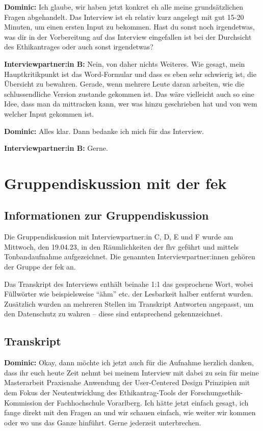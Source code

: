 \documentclass[a4paper,12pt,twoside]{scrreprt}
\begin{document}
\textbf{Dominic:} Ich glaube, wir haben jetzt konkret eh alle meine grundsätzlichen Fragen abgehandelt. Das Interview ist eh relativ kurz angelegt mit gut 15-20 Minuten, um einen ersten Input zu bekommen. Hast du sonst noch irgendetwas, was dir in der Vorbereitung auf das Interview eingefallen ist bei der Durchsicht des Ethikantrages oder auch sonst irgendetwas?

\textbf{Interviewpartner:in B:} Nein, von daher nichts Weiteres. Wie gesagt, mein Hauptkritikpunkt ist das Word-Formular und dass es eben sehr schwierig ist, die Übersicht zu bewahren. Gerade, wenn mehrere Leute daran arbeiten, wie die schlussendliche Version zustande gekommen ist. Das wäre vielleicht auch so eine Idee, dass man da mittracken kann, wer was hinzu geschrieben hat und von wem welcher Input gekommen ist.

\textbf{Dominic:} Alles klar. Dann bedanke ich mich für das Interview.

\textbf{Interviewpartner:in B:} Gerne.

\chapter{Gruppendiskussion mit der \acs{fek}}
\label{appendix:gruppendiskussion}

\section{Informationen zur Gruppendiskussion}
\label{appendix:gruppendiskussion-infos}

Die Gruppendiskussion mit Interviewpartner:in C, D, E und F wurde am Mittwoch, den 19.04.23, in den Räumlichkeiten der \ac{fhv} geführt und mittels Tonbandaufnahme aufgezeichnet. Die genannten Interviewpartner:innen gehören der Gruppe der \acl{fek} an.

Das Transkript des Interviews enthält beinahe 1:1 das gesprochene Wort, wobei Füllwörter wie beispielsweise \enquote{ähm} etc. der Lesbarkeit halber entfernt wurden. Zusätzlich wurden an mehreren Stellen im Transkript Antworten angepasst, um den Datenschutz zu wahren -- diese sind entsprechend gekennzeichnet.

\section{Transkript}
\label{appendix:gruppendiskussion-transkript}

\textbf{Dominic:} Okay, dann möchte ich jetzt auch für die Aufnahme herzlich danken, dass ihr euch heute Zeit nehmt bei meinem Interview mit dabei zu sein für meine Masterarbeit Praxisnahe Anwendung der User-Centered Design Prinzipien mit dem Fokus der Neutentwicklung des Ethikantrag-Tools der Forschungsethik-Kommission der Fachhochschule Vorarlberg. Ich hätte jetzt einfach gesagt, ich fange direkt mit den Fragen an und wir schauen einfach, wie weiter wir kommen oder wo uns das Ganze hinführt. Gerne jederzeit unterbrechen.
\end{document}
